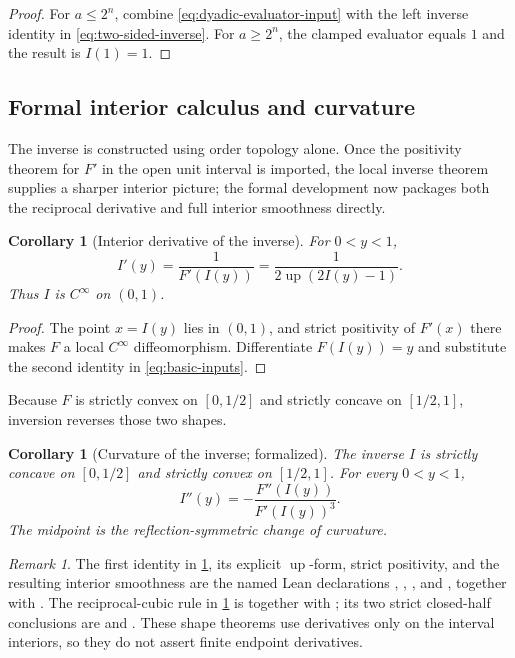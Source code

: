 \documentclass[11pt,oneside]{article}
\newtheorem{corollary}[theorem]{Corollary}
\theoremstyle{definition}
\theoremstyle{remark}
\newtheorem{remark}[theorem]{Remark}
\newcommand{\Up}{\operatorname{up}}
\begin{document}
\begin{proof}
For $a\le2^n$, combine \eqref{eq:dyadic-evaluator-input} with the left inverse identity in
\eqref{eq:two-sided-inverse}.  For $a\ge2^n$, the clamped evaluator equals $1$ and the result
is $I(1)=1$.
\end{proof}

\subsection{Formal interior calculus and curvature}

The inverse is constructed using order topology alone.  Once the positivity theorem for
$F'$ in the open unit interval is imported, the local inverse theorem supplies a sharper
interior picture; the formal development now packages both the reciprocal derivative and
full interior smoothness directly.

\begin{corollary}[Interior derivative of the inverse]
\label{cor:inverse-derivative}
For $0<y<1$,
\begin{equation}
 I'(y)=\frac{1}{F'(I(y))}
      =\frac{1}{2\Up(2I(y)-1)}.
 \label{eq:inverse-derivative}
\end{equation}
Thus $I$ is $C^\infty$ on $(0,1)$.
\end{corollary}

\begin{proof}
The point $x=I(y)$ lies in $(0,1)$, and strict positivity of $F'(x)$ there makes $F$ a local
$C^\infty$ diffeomorphism.  Differentiate $F(I(y))=y$ and substitute the second identity in
\eqref{eq:basic-inputs}.
\end{proof}

Because $F$ is strictly convex on $[0,1/2]$ and strictly concave on $[1/2,1]$, inversion
reverses those two shapes.

\begin{corollary}[Curvature of the inverse; formalized]
\label{cor:inverse-curvature}
The inverse $I$ is strictly concave on $[0,1/2]$ and strictly convex on $[1/2,1]$.  For every
$0<y<1$,
\begin{equation}
 I''(y)=-\frac{F''(I(y))}{F'(I(y))^3}.
 \label{eq:inverse-second-derivative}
\end{equation}
The midpoint is the reflection-symmetric change of curvature.
\end{corollary}

\begin{remark}
The first identity in \cref{cor:inverse-derivative}, its explicit \(\Up\)-form, strict
positivity, and the resulting interior smoothness are the named Lean declarations
,
, , and
, together with
.  The reciprocal-cubic rule in
\cref{cor:inverse-curvature} is  together with
; its two strict closed-half conclusions are
 and
.  These shape theorems use derivatives only on
the interval interiors, so they do not assert finite endpoint derivatives.
\end{remark}
\end{document}
